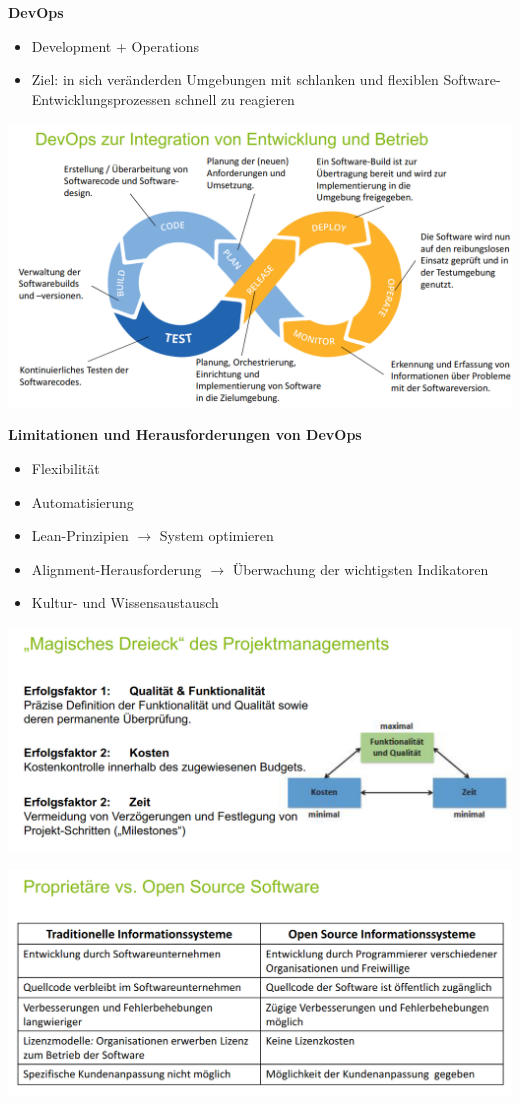 \documentclass[a4]{scrartcl}
\begin{document}
\textbf{DevOps}
\begin{itemize}
\item Development + Operations
\item Ziel: in sich veränderden Umgebungen mit schlanken und flexiblen Software-Entwicklungsprozessen schnell zu reagieren
\end{itemize}

\includegraphics[scale=0.3]{DevOps.png}

\newpage

\textbf{Limitationen und Herausforderungen von DevOps}

\begin{itemize}
\item Flexibilität
\item Automatisierung
\item Lean-Prinzipien $\rightarrow$ System optimieren
\item Alignment-Herausforderung $\rightarrow$ Überwachung der wichtigsten Indikatoren
\item Kultur- und Wissensaustausch
\end{itemize}

\includegraphics[scale=0.3]{magic.png}

\includegraphics[scale=0.3]{foss.png}
\end{document}
